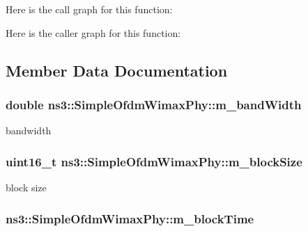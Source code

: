 Here is the call graph for this function\+:




Here is the caller graph for this function\+:




\subsection{Member Data Documentation}
\subsubsection[{\texorpdfstring{m\+\_\+band\+Width}{m_bandWidth}}]{\setlength{\rightskip}{0pt plus 5cm}double ns3\+::\+Simple\+Ofdm\+Wimax\+Phy\+::m\+\_\+band\+Width\hspace{0.3cm}{\ttfamily [private]}}\hypertarget{classns3_1_1SimpleOfdmWimaxPhy_a93298d46f3eabf4ba88bcaf7b1484917}{}\label{classns3_1_1SimpleOfdmWimaxPhy_a93298d46f3eabf4ba88bcaf7b1484917}


bandwidth 

\subsubsection[{\texorpdfstring{m\+\_\+block\+Size}{m_blockSize}}]{\setlength{\rightskip}{0pt plus 5cm}uint16\+\_\+t ns3\+::\+Simple\+Ofdm\+Wimax\+Phy\+::m\+\_\+block\+Size\hspace{0.3cm}{\ttfamily [private]}}\hypertarget{classns3_1_1SimpleOfdmWimaxPhy_a3f1a95a822adee3f7ceb2bb5a63db5c2}{}\label{classns3_1_1SimpleOfdmWimaxPhy_a3f1a95a822adee3f7ceb2bb5a63db5c2}


block size 

\subsubsection[{\texorpdfstring{m\+\_\+block\+Time}{m_blockTime}}]{ ns3\+::\+Simple\+Ofdm\+Wimax\+Phy\+::m\+\_\+block\+Time\hspace{0.3cm}{\ttfamily [private]}}\hypertarget{classns3_1_1SimpleOfdmWimaxPhy_ae87e2a7a2406f824acb988537520b1b7}{}\label{classns3_1_1SimpleOfdmWimaxPhy_ae87e2a7a2406f824acb988537520b1b7}


